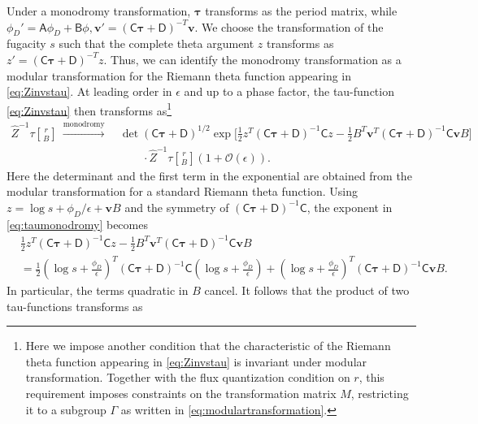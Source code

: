 \documentclass[11pt, a4paper]{article}
\newcommand{\tauftn}[2]{\tau\genfrac[]{0pt}{1}{#1}{#2}}
\theoremstyle{definition}
\begin{document}
Under a monodromy transformation, $\boldsymbol\tau$ transforms as the period
matrix, while $\phi_D'=\mathsf A\phi_D+\mathsf B\phi,\boldsymbol v'=(\mathsf C\boldsymbol\tau+\mathsf D)^{-T}\boldsymbol v$. We choose the transformation of the fugacity $s$ such that the complete theta argument $z$ transforms as $z'=(\mathsf{C}\boldsymbol\tau+\mathsf{D})^{-T}z$. Thus, we can identify the monodromy transformation as a modular transformation for the Riemann theta function appearing in \eqref{eq:Zinvstau}. At leading order in $\epsilon$ and up to a phase factor, the tau-function \eqref{eq:Zinvstau} then transforms as\footnote{Here we impose another condition that the characteristic of the Riemann theta function appearing in \eqref{eq:Zinvstau} is invariant under modular transformation. Together with the flux quantization condition on $r$, this requirement imposes constraints on the transformation matrix $M$, restricting it to a subgroup $\Gamma$ as written in \eqref{eq:modulartransformation}.}
\begin{align}\label{eq:taumonodromy}
    \hat Z^{-1}\tauftn{r}{B} \
    \xrightarrow{\mathrm{monodromy}} \
    &\det(\mathsf{C}\boldsymbol\tau+\mathsf{D})^{1/2}
    \exp\Bigg[
            \frac{1}{2}z^T(\mathsf{C}\boldsymbol\tau+\mathsf{D})^{-1}\mathsf{C}z
            -\frac{1}{2}B^T\boldsymbol v^T(\mathsf{C}\boldsymbol\tau+\mathsf{D})^{-1}
            \mathsf{C}\boldsymbol vB
    \Bigg] \nonumber \\
    &\qquad \cdot \hat Z^{-1}\tauftn{r}{B} \left(1+\mathcal{O}(\epsilon)\right).
\end{align}
Here the determinant and the first term in the exponential are obtained from the modular transformation for a standard Riemann theta function. Using $z=\log s+\phi_D/\epsilon+\boldsymbol vB$ and the symmetry of $(\mathsf{C}\boldsymbol\tau+\mathsf{D})^{-1}\mathsf{C}$, the exponent in \eqref{eq:taumonodromy} becomes
\begin{align}
    &
    \frac{1}{2}z^T(\mathsf{C}\boldsymbol\tau+\mathsf{D})^{-1}\mathsf{C}z
    -\frac{1}{2}B^T\boldsymbol v^T(\mathsf{C}\boldsymbol\tau+\mathsf{D})^{-1}
    \mathsf{C}\boldsymbol vB \\
    &=
    \frac{1}{2}
    \left(\log s+\frac{\phi_D}{\epsilon}\right)^T
    (\mathsf{C}\boldsymbol\tau+\mathsf{D})^{-1}\mathsf{C}
    \left(\log s+\frac{\phi_D}{\epsilon}\right)
    +
    \left(\log s+\frac{\phi_D}{\epsilon}\right)^T
    (\mathsf{C}\boldsymbol\tau+\mathsf{D})^{-1}\mathsf{C}\boldsymbol vB . \nonumber
\end{align}
In particular, the terms quadratic in $B$ cancel. It follows that the product of two tau-functions transforms as
\end{document}
